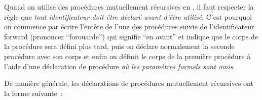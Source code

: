 Quand on utilise des procédures mutuellement récursives en \pascal, il faut
respecter la règle que {\em tout identificateur doit être déclaré avant d'être
utilisé}.  C'est pourquoi on commence par écrire l'entête de l'une des pro\-cé\-du\-res suivie
de l'identificateur {\idt forward} (prononcer ``forouarde'') qui signifie ``en avant'' et indique
que le corps de la procédure sera défini plus tard, puis on déclare normalement la seconde
procédure avec son corps et enfin on définit le corps de la première procédure à l'aide d'une déclaration
de procédure {\em où les paramètres formels sont omis}.

De manière générale, les déclarations de procédures mutuellement
ré\-cur\-si\-ves ont  la forme suivante~:

\vfill

